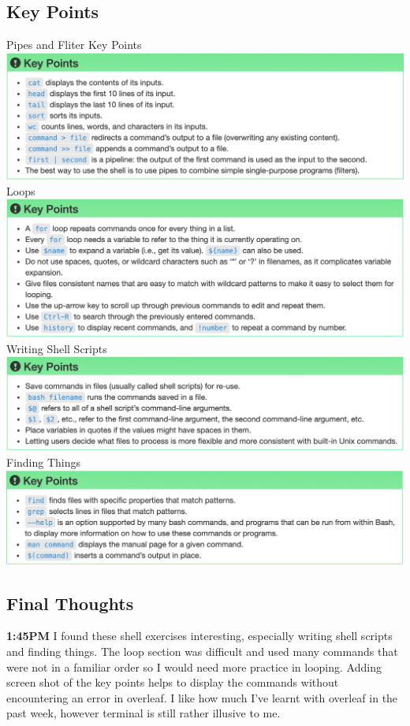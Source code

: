 \documentclass{article}
\begin{document}
\subsection{Key Points}
Pipes and Fliter Key Points \\
\includegraphics[width=\textwidth]{Images/PipesFilters_KP.png}\\
Loops \\
\includegraphics[width=\textwidth]{Images/Loop_KP.png} \\
Writing Shell Scripts \\
\includegraphics[width=\textwidth]{Images/WritingShellScripts_KP.png} \\
Finding Things \\
\includegraphics[width=\textwidth]{Images/FindingThings_KP.png} \\

\subsection{Final Thoughts}
\textbf{1:45PM} I found these shell exercises interesting, especially writing shell scripts and finding things. The loop section was difficult and used many commands that were not in a familiar order so I would need more practice in looping. Adding screen shot of the key points helps to display the commands without encountering an error in overleaf. I like how much I've learnt with overleaf in the past week, however terminal is still rather illusive to me. 
\end{document}

